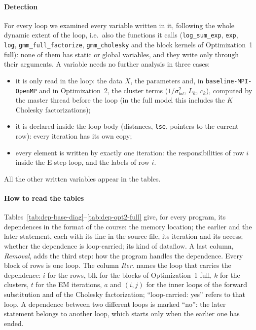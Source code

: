 \documentclass[conference,onecolumn]{IEEEtran}
\newcommand{\vbase}{\texttt{baseline-\allowbreak MPI-\allowbreak OpenMP}}
\begin{document}
\paragraph{Detection} For every loop we examined every variable written in it, following the whole dynamic extent of the loop, i.e.\ also the functions it calls (\texttt{log\_sum\_exp}, \texttt{exp}, \texttt{log}, \texttt{gmm\_full\_factorize}, \texttt{gmm\_cholesky} and the block kernels of Optimization~1 full): none of them has static or global variables, and they write only through their arguments. A variable needs no further analysis in three cases:
\begin{itemize}
\item it is only read in the loop: the data $X$, the parameters and, in \vbase{} and in Optimization~2, the cluster terms ($1/\sigma^2_{kd}$, $L_k$, $c_k$), computed by the master thread before the loop (in the full model this includes the $K$ Cholesky factorizations);
\item it is declared inside the loop body (distances, \texttt{lse}, pointers to the current row): every iteration has its own copy;
\item every element is written by exactly one iteration: the responsibilities of row $i$ inside the E-step loop, and the labels of row $i$.
\end{itemize}
All the other written variables appear in the tables.

\paragraph{How to read the tables} Tables~\ref{tab:dep-base-diag}--\ref{tab:dep-opt2-full} give, for every program, its dependences in the format of the course: the memory location; the earlier and the later statement, each with its line in the source file, its iteration and its access; whether the dependence is loop-carried; its kind of dataflow. A last column, \emph{Removal}, adds the third step: how the program handles the dependence. Every block of rows is one loop. The column \emph{Iter.} names the loop that carries the dependence: $i$ for the rows, blk for the blocks of Optimization~1 full, $k$ for the clusters, $t$ for the EM iterations, $a$ and $(i,j)$ for the inner loops of the forward substitution and of the Cholesky factorization; ``loop-carried: yes'' refers to that loop. A dependence between two different loops is marked ``no'': the later statement belongs to another loop, which starts only when the earlier one has ended.
\end{document}

